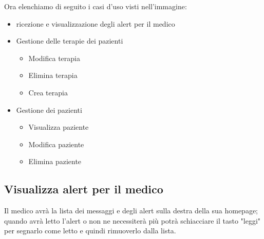\documentclass{report}
\begin{document}
\vspace{1cm}
Ora elenchiamo di seguito i casi d'uso visti nell'immagine:
\begin{itemize}
    \item ricezione e visualizzazione degli alert per il medico
    \item Gestione delle terapie dei pazienti
        \begin{itemize}
            \item Modifica terapia
            \item Elimina terapia
            \item Crea terapia
        \end{itemize}
    \item Gestione dei pazienti
        \begin{itemize}
            \item Visualizza paziente
            \item Modifica paziente
            \item Elimina paziente
        \end{itemize}
\end{itemize}
\vspace{0.5cm}
\subsection{Visualizza alert per il medico}

Il medico avrà la lista dei messaggi e degli alert sulla destra della sua
homepage; quando avrà letto l'alert o non ne necessiterà più potrà schiacciare
il tasto "leggi" per segnarlo come letto e quindi rimuoverlo dalla lista.

\vspace{0.5cm}

\end{document}
